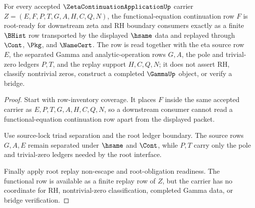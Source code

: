 \begin{theorem}
\label{thm:zeta-continuation-application-root-functional-row-readiness}
For every accepted $\ZetaContinuationApplicationUp$ carrier
$Z=(E,F,P,T,G,A,H,C,Q,N)$, the functional-equation continuation row $F$ is
root-ready for downstream zeta and RH boundary consumers exactly as a finite
$\BHist$ row transported by the displayed $\hsame$ data and replayed through
$\Cont$, $\Pkg$, and $\NameCert$. The row is read together with the eta source
row $E$, the separated Gamma and analytic-operation rows $G,A$, the pole and
trivial-zero ledgers $P,T$, and the replay support $H,C,Q,N$; it does not
assert RH, classify nontrivial zeros, construct a completed $\GammaUp$ object,
or verify a bridge.
\end{theorem}
\begin{proof}
Start with row-inventory coverage. It places $F$ inside the same accepted
carrier as $E,P,T,G,A,H,C,Q,N$, so a downstream consumer cannot read a
functional-equation continuation row apart from the displayed packet.

Use source-lock triad separation and the root ledger boundary. The source rows
$G,A,E$ remain separated under $\hsame$ and $\Cont$, while $P,T$ carry only the
pole and trivial-zero ledgers needed by the root interface.

Finally apply root replay non-escape and root-obligation readiness. The
functional row is available as a finite replay row of $Z$, but the carrier has
no coordinate for RH, nontrivial-zero classification, completed Gamma data, or
bridge verification.
\end{proof}

